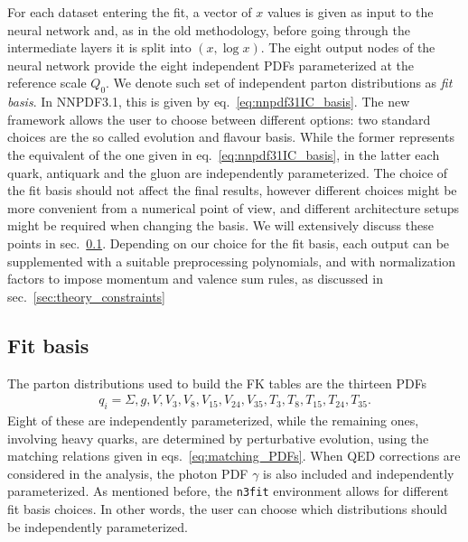 %
For each dataset entering the fit, a vector of $x$ values is given as input to the neural network and,
as in the old methodology, before going through the intermediate layers it is split into $\left(x,\log x\right)$.
The eight output nodes of the neural network provide the eight independent PDFs parameterized at 
the reference scale $Q_0$. We denote such set of independent parton distributions as \textit{fit basis}.
In NNPDF3.1, this is given by eq.~\eqref{eq:nnpdf31IC_basis}. The new framework allows the user to choose between 
different options: two standard choices are the so called evolution and flavour basis.
While the former represents the equivalent of the one given in eq.~\eqref{eq:nnpdf31IC_basis}, in
the latter each quark, antiquark and the gluon are independently parameterized. 
The choice of the fit basis should not affect the final results, however different choices might be more
convenient from a numerical point of view, and different architecture setups might be required
when changing the basis. We will extensively discuss these points in sec.~\ref{sec:fitbasis}.
Depending on our choice for the fit basis, each output can be supplemented with a suitable preprocessing
polynomials, and with normalization factors to impose momentum and valence sum rules,
as discussed in sec.~\ref{sec:theory_constraints}

\subsection{Fit basis}
\label{sec:fitbasis}
The parton distributions used to build the FK tables are the thirteen PDFs
\begin{align}
	\label{eq::fkdistributions}
	q_i = \Sigma, g, V, V_3, V_8, V_{15}, V_{24}, V_{35}, T_3, T_8, T_{15}, T_{24}, T_{35}.
\end{align}
Eight of these are independently parameterized, while the remaining ones, involving heavy quarks,
are determined by perturbative evolution, using the matching relations given in eqs.~\eqref{eq:matching_PDFs}.
When QED corrections are considered in the analysis,
the photon PDF $\gamma$ is also included and independently parameterized.   
As mentioned before, the {\tt n3fit} environment allows for different fit basis choices. In other 
words, the user can choose which distributions should be independently parameterized. 


